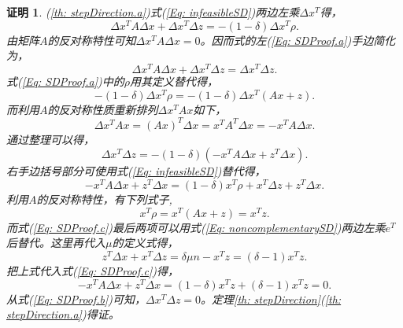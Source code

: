 \documentclass{ctexart}
\numberwithin{equation}{section} %
\newtheorem*{Proof}{证明}
\begin{document}
\begin{Proof}
	(\ref{th: stepDirection.a})式(\ref{Eq: infeasibleSD})两边左乘$ \Delta x^{T} $得，
	\begin{equation}
		\label{Eq: SDProof.a}
		\Delta x^{T}A\Delta x + \Delta x^{T}\Delta z = -\left(1 - \delta\right)\Delta x^{T}\rho.
	\end{equation}
	由矩阵$ A $的反对称特性可知$ \Delta x^{T}A\Delta x = 0 $。因而式的左(\ref{Eq: SDProof.a})手边简化为，
	\begin{equation}
		\Delta x^{T}A\Delta x + \Delta x^{T}\Delta z = \Delta x^{T}\Delta z.  \nonumber
	\end{equation}
	式(\ref{Eq: SDProof.a})中的$ \rho $用其定义替代得，
	\begin{equation}
		-\left(1 - \delta\right)\Delta x^{T}\rho = -\left(1 - \delta\right)\Delta x^{T}\left(Ax + z\right).  \nonumber
	\end{equation}
	而利用$ A $的反对称性质重新排列$ \Delta x^{T}Ax $如下，
	\begin{equation}
		\Delta x^{T}Ax = \left(Ax\right)^T\Delta x = x^TA^T\Delta x = -x^TA\Delta x.  \nonumber
	\end{equation}
	通过整理可以得，
	\begin{equation}
		\label{Eq: SDProof.b}
		\Delta x^T\Delta z = - \left(1 - \delta\right)\left(-x^TA\Delta x + z^T\Delta x\right).
	\end{equation}
	右手边括号部分可使用式(\ref{Eq: infeasibleSD})替代得，
	\begin{equation}
		\label{Eq: SDProof.c}
		-x^TA\Delta x + z^T\Delta x = \left(1 - \delta\right)x^T\rho + x^T\Delta z + z^T\Delta x.
	\end{equation}
	利用$ A $的反对称特性，有下列式子,
	\begin{equation}
		x^T\rho = x^T\left(Ax + z\right) = x^Tz.  \nonumber
	\end{equation}
	而式(\ref{Eq: SDProof.c})最后两项可以用式(\ref{Eq: noncomplementarySD})两边左乘$ e^T $后替代。这里再代入$ \mu $的定义式得，
	\begin{equation}
		z^T\Delta x + x^T\Delta z = \delta\mu n - x^Tz = \left(\delta - 1\right)x^Tz.  \nonumber
	\end{equation}
	把上式代入式(\ref{Eq: SDProof.c})得，
	\begin{equation}
		-x^TA\Delta x + z^T\Delta x = \left(1 - \delta\right)x^Tz + \left(\delta - 1\right)x^Tz = 0.  \nonumber
	\end{equation}
	从式(\ref{Eq: SDProof.b})可知，$ \Delta x^T\Delta z = 0 $。定理\ref{th: stepDirection}(\ref{th: stepDirection.a})得证。

\end{Proof}
\end{document}
